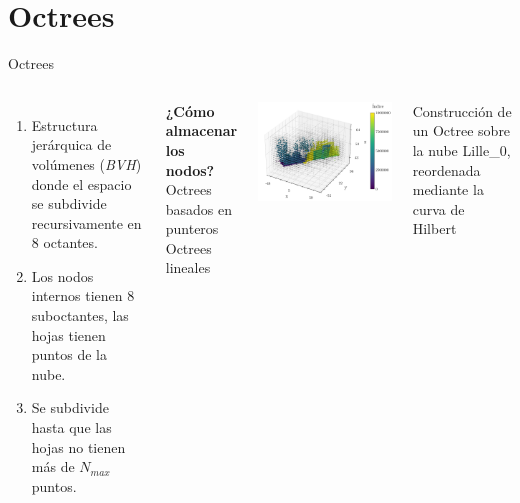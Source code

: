 \documentclass[aspectratio=169]{beamer}
\begin{document}
\section{Octrees}
\begin{frame}{Octrees}
    \begin{columns}
        \begin{enumerate}
            \item Estructura jerárquica de volúmenes (\textit{BVH}) donde el espacio se subdivide recursivamente en $8$ octantes.
            \item Los nodos internos tienen 8 suboctantes, las hojas tienen puntos de la nube. 
            \item Se subdivide hasta que las hojas no tienen más de $N_{max}$ puntos.
        \end{enumerate}
        \vspace{0.8em}

        \begin{block}{\textbf{¿Cómo almacenar los nodos?}}
            \textrightarrow \: Octrees basados en punteros \\
            \textrightarrow \: Octrees lineales
        \end{block}
        \includegraphics[scale=0.5]{img/plot_Lille_0_hilbert_oct.pdf}
        {\scriptsize \centering Construcción de un Octree sobre la nube Lille\_0, reordenada mediante la curva de Hilbert \par}
    \end{columns}
    
\end{frame}
\end{document}
